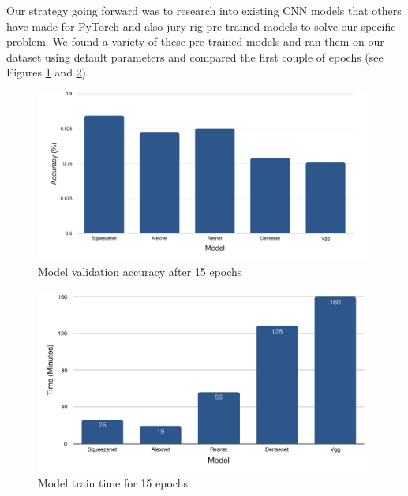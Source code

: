 \documentclass{article}
\begin{document}
Our strategy going forward was to research into existing CNN models that others have made for PyTorch 
and also jury-rig pre-trained models to solve our specific problem. We found a variety of these pre-trained 
models and ran them on our dataset using default parameters and compared the first couple of epochs (see 
Figures \ref{fig:modelValAcc} and \ref{fig:modelTrainTime}).

\begin{figure}
  \begin{center}
  \includegraphics[width=\textwidth]{./figs/pretrainedAccuracyCropped.png}
  \caption{Model validation accuracy after 15 epochs}
  \label{fig:modelValAcc}
  \end{center}
\end{figure}

\begin{figure}
  \begin{center}
  \includegraphics[width=\textwidth]{./figs/pretrainedTimeCropped.png}
  \caption{Model train time for 15 epochs}
  \label{fig:modelTrainTime}
  \end{center}
\end{figure}
\end{document}
